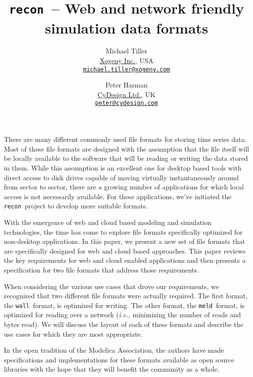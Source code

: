 \documentclass[11pt,a4paper]{article}
\newcommand{\recon}{\texttt{recon}}
\newcommand{\wall}{\texttt{wall}}
\newcommand{\meld}{\texttt{meld}}
\begin{document}
\thispagestyle{empty}

\title{\recon\  -- Web and network friendly simulation data formats}

\author{Michael Tiller\\
  \href{http://xogeny.com}{Xogeny Inc.}, USA\\
  \href{mailto:michael.tiller@xogeny.com}
       {\nolinkurl{michael.tiller@xogeny.com}}
  \and Peter Harman\\
  \href{http://www.cydesign.com}
       {CyDesign Ltd.}, UK\\
  \href{mailto:peter@cydesign.com}{\nolinkurl{peter@cydesign.com}}}
\date{} %
\maketitle\thispagestyle{empty} %

There are many different commonly used file formats for storing time
series data.  Most of these file formats are designed with the
assumption that the file itself will be locally available to the
software that will be reading or writing the data stored in them.
While this assumption is an excellent one for desktop based tools with
direct access to disk drives capable of moving virtually
instantaneously around from sector to sector, there are a growing
number of applications for which local access is not necessarily
available.  For these applications, we've initiated the
\recon\ project to develop more suitable formats.

With the emergence of web and cloud based modeling and simulation
technologies, the time has come to explore file formats specifically
optimized for non-desktop applications.  In this paper, we present a
new set of file formats that are specifically designed for web and
cloud based approaches.  This paper reviews the key requirements for
web and cloud enabled applications and then presents a specification
for two file formats that address those requirements.

When considering the various use cases that drove our requirements, we
recognized that two different file formats were actually required.
The first format, the \wall\ format, is optimized for writing.  The
other format, the \meld\ format, is optimized for reading over a
network (\textit{i.e.,} minimizing the number of reads and bytes
read).  We will discuss the layout of each of these formats and
describe the use cases for which they are most appropriate.

In the open tradition of the Modelica Association, the authors have
made specifications and implementations for these formats available as
open source libraries with the hope that they will benefit the
community as a whole.

\printbibliography
\end{document}

